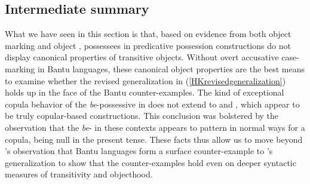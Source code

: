 \documentclass[output=paper,
modfonts
]{langscibook}
\begin{document}
\subsection{Intermediate summary}
	What we have seen in this section is that, based on evidence
        from both object marking and object , possessees in
        predicative possession constructions do not display canonical
        properties of transitive objects. Without  overt
        accusative case-marking in Bantu languages, these canonical
        object properties are the best means to examine
        whether the revised generalization in
        (\ref{HKrevisedgeneralization}) holds up in the face of the
        Bantu counter-examples.  The kind of
        exceptional copula behavior of the {\it be}-possessive in
         does not extend to  and , which appear to be
        truly copular-based constructions.  This conclusion was
        bolstered by the observation that the {\it be}- in these
        contexts appears to pattern in normal ways for a copula, being
        null in the present tense.  These facts thus allow us to move beyond \citet{Antonov:2014}'s observation that Bantu languages form a surface counter-example to \citet{Harves:2012}'s generalization to show that the counter-examples hold even on deeper syntactic measures of transitivity and objecthood.
        


\end{document}
